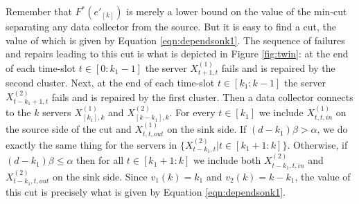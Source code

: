 \documentclass[journal,onecolumn,draftcls]{IEEEtran}
\begin{document}
Remember that $F^*(e'_{[k]})$ is merely a lower bound on the value of the min-cut separating any data collector from the source. But it is easy to find a cut, the value of which is given by Equation \eqref{eqn:dependsonk1}. The sequence of failures and repairs leading to this cut is what is depicted in Figure \ref{fig:twin}: at the end of each time-slot $t\in [0:k_1-1]$ the server $X^{(1)}_{t+1,t}$ fails and is repaired by the second cluster. Next, at the end of each time-slot $t\in[k_1:k-1]$ the server $X^{(2)}_{t-k_1+1,t}$ fails and is repaired by the first cluster. Then a data collector connects to the $k$ servers $X^{(1)}_{[k_1],k}$ and $X^{(2)}_{[k-k_1],k}$. For every $t\in[k_1]$ we include $X^{(1)}_{t,t,in}$ on the source side of the cut and $X^{(1)}_{t,t,out}$ on the sink side. If $(d-k_1)\beta > \alpha$, we do exactly the same thing for the servers in $\{X^{(2)}_{t-k_1,t}| t\in[k_1+1:k]\}$. Otherwise, if $(d-k_1)\beta \le \alpha$ then for all $t\in[k_1+1:k]$ we include both $X^{(2)}_{t-k_1,t,in}$ and $X^{(2)}_{t-k_1,t,out}$ on the sink side.  Since $v_1(k) = k_1$ and $v_2(k) = k - k_1$, the value of this cut is precisely what is given by Equation \eqref{eqn:dependsonk1}.
\end{document}
